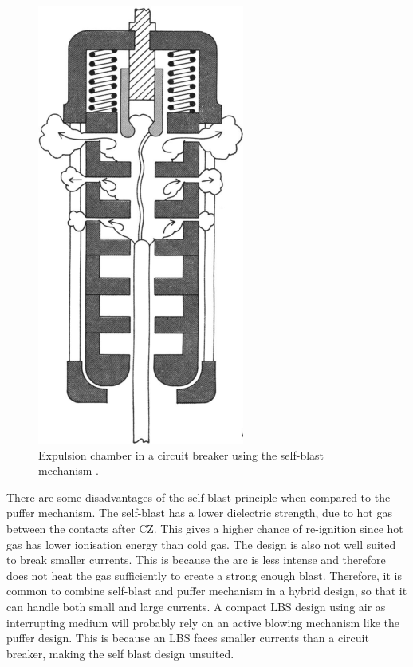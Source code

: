 \documentclass[10pt,b5paper,twoside]{article}
\begin{document}
\begin{figure} [H]
\centering
\includegraphics[scale=0.33]{Bilder/Theory/selfBlast.png}
\caption{Expulsion chamber in a circuit breaker using the self-blast mechanism \cite{bib:CBAC}.} \label{fig:selfBlast}
\end{figure}

There are some disadvantages of the self-blast principle when compared to the puffer mechanism. The self-blast has a lower dielectric strength, due to hot gas between the contacts after CZ. This gives a higher chance of re-ignition since hot gas has lower ionisation energy than cold gas. The design is also not well suited to break smaller currents. This is because the arc is less intense and therefore does not heat the gas sufficiently to create a strong enough blast. Therefore, it is common to combine self-blast and puffer mechanism in a hybrid design, so that it can handle both small and large currents. A compact LBS design using air as interrupting medium will probably rely on an active blowing mechanism like the puffer design. This is because an LBS faces smaller currents than a circuit breaker, making the self blast design unsuited.
\end{document}
